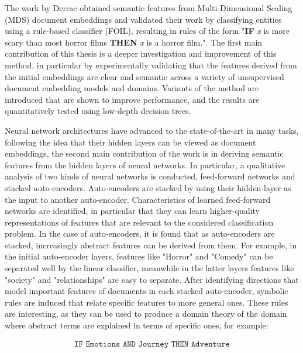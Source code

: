 \documentclass[a4paper,oneside,onecolumn,openright,12pt]{book}
\begin{document}

The work by Derrac \cite{Derrac2015} obtained semantic features from Multi-Dimensional Scaling (MDS) document embeddings and validated their work by classifying entities using a rule-based classifier (FOIL), resulting in rules of the form "\textbf{IF} \textit{x} is more scary than most horror films \textbf{THEN} \textit{x} is a horror film.". The first main contribution of this thesis is a deeper investigation and improvement of this method, in particular by  experimentally validating that the  features derived from the initial embeddings are clear and semantic across a variety of unsupervised document embedding models and domains. Variants of the method are introduced that are shown to improve  performance, and the results are  quantitatively tested using low-depth decision trees.


Neural network architectures have advanced to the state-of-the-art  in many tasks, following the idea that their hidden layers can be viewed as document embeddings, the second main contribution of the work is in deriving semantic features from the hidden layers of neural networks. In particular, a qualitative analysis of two kinds of neural networks is conducted, feed-forward networks and stacked auto-encoders. Auto-encoders are  stacked by using their hidden-layer as the input  to another auto-encoder. Characteristics of  learned feed-forward networks are identified, in particular that they can learn higher-quality representations of  features that are relevant to the considered classification problem. In the case of auto-encoders, it is found  that as  auto-encoders are  stacked, increasingly abstract features can be derived from them. For example, in the initial auto-encoder layers, features like "Horror" and "Comedy" can be separated well by the linear classifier, meanwhile in the latter layers features like "society" and "relationships" are easy to separate. After identifying directions that model important features of documents in each stacked auto-encoder, symbolic rules are induced that relate specific features to more general ones. These rules are interesting, as they can be used to produce a domain theory of the domain where abstract terms are explained in terms of specific ones, for example:

\begin{align}\label{rule1}\texttt{IF Emotions  AND  Journey THEN Adventure}\end{align} 
\end{document}
